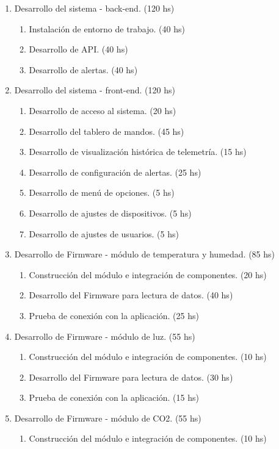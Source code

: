 \documentclass[
11pt, %
]{charter}
\begin{document}
\begin{enumerate}
\begin{enumerate}
	\end{enumerate}
\item Desarrollo del sistema - back-end. (120 hs)
	\begin{enumerate}
	\item Instalación de entorno de trabajo. (40 hs)
	\item Desarrollo de API. (40 hs)
	\item Desarrollo de alertas. (40 hs)
	\end{enumerate}
\item Desarrollo del sistema - front-end. (120 hs)
	\begin{enumerate}
	\item Desarrollo de acceso al sistema. (20 hs)
	\item Desarrollo del tablero de mandos. (45 hs)
	\item Desarrollo de visualización histórica de telemetría. (15 hs)
	\item Desarrollo de configuración de alertas. (25 hs)
	\item Desarrollo de menú de opciones. (5 hs)
	\item Desarrollo de ajustes de dispositivos. (5 hs)
	\item Desarrollo de ajustes de usuarios. (5 hs)
	\end{enumerate}
\item Desarrollo de Firmware - módulo de temperatura y humedad. (85 hs)
	\begin{enumerate}
	\item Construcción del módulo e integración de componentes. (20 hs)
	\item Desarrollo del Firmware para lectura de datos. (40 hs)
	\item Prueba de conexión con la aplicación. (25 hs)
	\end{enumerate}
\item Desarrollo de Firmware - módulo de luz. (55 hs)
	\begin{enumerate}
	\item Construcción del módulo e integración de componentes. (10 hs)
	\item Desarrollo del Firmware para lectura de datos. (30 hs)
	\item Prueba de conexión con la aplicación. (15 hs)
	\end{enumerate}
\item Desarrollo de Firmware - módulo de CO2. (55 hs)
	\begin{enumerate}
	\item Construcción del módulo e integración de componentes. (10 hs)

\end{enumerate}
\end{enumerate}
\end{document}
